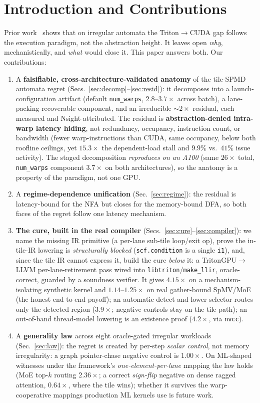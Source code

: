 \documentclass[acmsmall,review,anonymous]{acmart}
\begin{document}
\section{Introduction and Contributions}
Prior work~\cite{paper1} shows that on irregular automata the Triton$\rightarrow$CUDA gap
follows the execution paradigm, not the abstraction height. It leaves open \emph{why}, mechanistically,
and \emph{what} would close it. This paper answers both. Our contributions:
\begin{enumerate}
\item A \textbf{falsifiable, cross-architecture-validated anatomy} of the tile-SPMD automata regret
(Secs.~\ref{sec:decomp}--\ref{sec:resid}): it decomposes into a launch-configuration artifact
(default \texttt{num\_warps}, $2.8$--$3.7\times$ across batch), a lane-packing-recoverable component,
and an irreducible ${\sim}2\times$ residual, each measured and Nsight-attributed. The residual is
\textbf{abstraction-denied intra-warp latency hiding}, not redundancy, occupancy, instruction count,
or bandwidth (fewer warp-instructions than CUDA, same occupancy, below both roofline ceilings, yet
$15.3\times$ the dependent-load stall and $9.9\%$ vs.\ $41\%$ issue activity). The staged decomposition
\emph{reproduces on an A100} (same $26\times$ total, \texttt{num\_warps} component $3.7\times$ on both
architectures), so the anatomy is a property of the paradigm, not one GPU.
\item A \textbf{regime-dependence unification} (Sec.~\ref{sec:regime}): the residual is latency-bound
for the NFA but closes for the memory-bound DFA, so both faces of the regret follow one latency mechanism.
\item \textbf{The cure, built in the real compiler} (Secs.~\ref{sec:cure}--\ref{sec:compiler}): we name
the missing IR primitive (a per-lane sub-tile loop/exit op), prove the in-tile-IR lowering is
\emph{structurally blocked} (\texttt{scf.condition} is a single \texttt{i1}), and, since the tile IR
cannot express it, build the cure \emph{below} it: a \mbox{TritonGPU$\rightarrow$LLVM} per-lane-retirement
pass wired into \texttt{libtriton}/\texttt{make\_llir}, oracle-correct, guarded by a soundness verifier.
It gives $4.15\times$ on a mechanism-isolating synthetic kernel and $1.14$--$1.25\times$ on real
gather-bound SpMV/MoE (the honest end-to-end payoff); an automatic detect-and-lower selector routes only
the detected region ($3.9\times$; negative controls stay on the tile path); an out-of-band thread-model
lowering is an existence proof ($4.2\times$, via \texttt{nvcc}).
\item A \textbf{generality law} across eight oracle-gated irregular workloads (Sec.~\ref{sec:law}):
the regret is created by per-step \emph{scalar control}, not memory irregularity: a graph pointer-chase
negative control is $1.00\times$. On ML-shaped witnesses under the framework's \emph{one-element-per-lane}
mapping the law holds (MoE top-$k$ routing $2.36\times$; a correct \emph{sign-flip} negative on dense
ragged attention, $0.64\times$, where the tile wins); whether it survives the warp-cooperative mappings
production ML kernels use is future work.
\end{enumerate}
\end{document}
